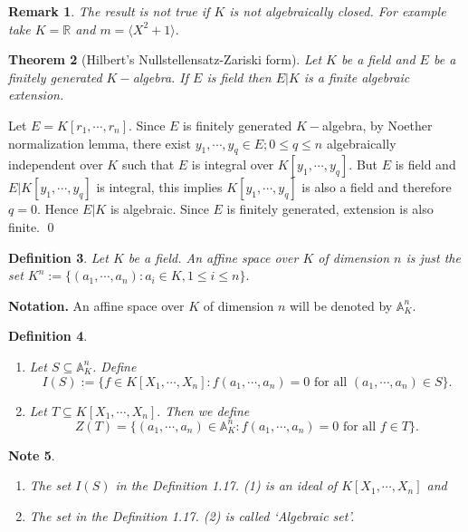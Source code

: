 \documentclass[11pt]{amsart}
\newtheorem{theorem}{Theorem}[section]
\newtheorem{defn}[theorem]{Definition}
\newtheorem{note}[theorem]{Note}
\newtheorem{remark}[theorem]{Remark}%
\newcommand{\RR}{\mathbb R}
\newcommand{\gen}[1]{\langle#1\rangle}
\begin{document}
\begin{remark}

The result is not true if $K$ is not algebraically closed. For example take $K={\RR}$ and $m=\gen{X^2+1}.$

\end{remark}

\begin{theorem}[Hilbert's Nullstellensatz-Zariski form]

Let $K$ be a field and $E$ be a finitely generated $K-$algebra. If $E$ is field then $E|K$ is a finite algebraic extension.

\end{theorem}

\proof Let $E=K[r_1,\cdots,r_n].$ Since $E$ is finitely generated $K-$algebra, by Noether normalization lemma, there exist $y_1,\cdots,y_q\in E;0\leq q\leq n$ algebraically independent over $K$ such that $E$ is integral over $K[y_1,\cdots,y_q].$ But $E$ is field and $E|K[y_1,\cdots, y_q]$ is integral, this implies $K[y_1,\cdots,y_q]$ is also a field and therefore $q=0.$ Hence $E|K$ is algebraic. Since $E$ is finitely generated, extension is also finite. \qed

\begin{defn}

Let $K$ be a field. An affine space over $K$ of dimension $n$ is just the set $K^n:=\{(a_1,\cdots,a_n):a_i\in K,1\leq i\leq n\}.$

\end{defn}

\textbf{Notation.} An affine space over $K$ of dimension $n$ will be denoted by $\mathbb{A}^n_K.$

\begin{defn}

\begin{enumerate}

\item Let $S\subseteq \mathbb{A}^n_K$. Define $$I(S):=\{f\in K[X_1,\cdots, X_n]:f(a_1,\cdots,a_n)=0\text{ for all }(a_1,\cdots,a_n)\in S\}.$$

\item Let $T\subseteq K[X_1,\cdots, X_n].$ Then we define $$Z(T)=\{(a_1,\cdots,a_n)\in \mathbb{A}_K^n:f(a_1,\cdots,a_n)=0\text{ for all }f\in T\}.$$

\end{enumerate}

\end{defn}

\begin{note}

\begin{enumerate}

\item The set $I(S)$ in the Definition 1.17. (1) is an ideal of $K[X_1,\cdots,X_n]$ and 

\item The set in the Definition 1.17. (2) is called `Algebraic set'.

\end{enumerate}

\end{note}
\end{document}

